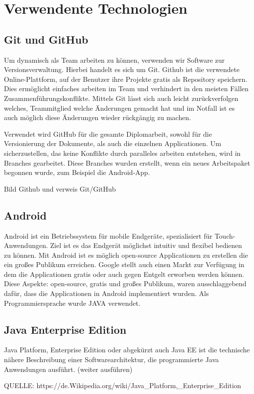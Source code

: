 \chapter{Verwendente Technologien}
\section{Git und GitHub}
Um dynamisch als Team arbeiten zu können, verwenden wir Software zur Versionsverwaltung. Hierbei handelt es sich um Git. 
Github ist die verwendete Online-Plattform, auf der Benutzer ihre Projekte gratis als Repository speichern. Dies ermöglicht einfaches arbeiten im Team und verhindert in den meisten Fällen Zusammenführungskonflikte. Mittels Git lässt sich auch leicht zurückverfolgen welches, Teammitglied welche Änderungen gemacht hat und im Notfall ist es auch möglich diese Änderungen wieder rückgängig zu machen.

Verwendet wird GitHub für die gesamte Diplomarbeit, sowohl für die Versionierung der Dokumente, als auch  die einzelnen Applicationen. Um sicherzustellen, das keine Konflikte durch paralleles arbeiten entstehen, wird in Branches gearbeitet. Diese Branches wurden erstellt, wenn ein neues Arbeitspaket begonnen wurde, zum Beispiel die Android-App.

Bild Github und verweis Git/GitHub

\section{Android}

Android ist ein Betriebssystem für mobile Endgeräte, spezialisiert für Touch-Anwendungen. Ziel ist es das Endgerät möglichst intuitiv und flexibel bedienen zu können. Mit Android ist es möglich open-source Applicationen zu erstellen die ein großes Publikum erreichen. Google stellt auch einen Markt zur Verfügung in dem die Applicationen gratis oder auch gegen Entgelt erworben werden können.
Diese Aspekte: open-source, gratis und großes Publikum, waren ausschlaggebend dafür, dass die Applicationen in Android implementiert wurden. Als Programmiersprache wurde JAVA verwendet.




\section{Java Enterprise Edition}\label{sec:javaee}
Java Platform, Enterprise Edition oder abgekürzt auch Java EE ist die technische nähere Beschreibung einer Softwarearchitektur, die programmierte Java Anwendungen ausführt.
(weiter ausführen)

QUELLE: https://de.Wikipedia.org/wiki/Java_Platform,_Enterprise_Edition